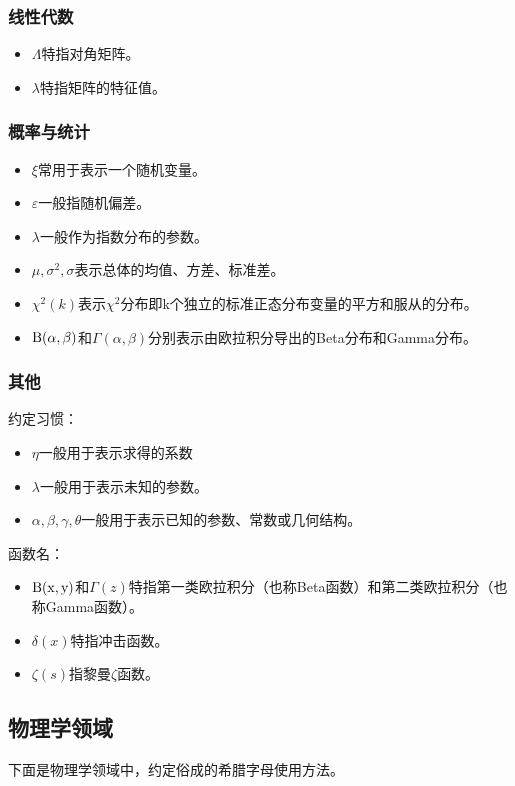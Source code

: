 \subsubsection{线性代数}

\begin{itemize}
\item $\Lambda$特指对角矩阵。
\item $\lambda$特指矩阵的特征值。
\end{itemize}

\subsubsection{概率与统计}

\begin{itemize}
\item $\xi$常用于表示一个随机变量。
\item $\varepsilon$一般指随机偏差。
\item $\lambda$一般作为指数分布的参数。
\item $\mu,\sigma^2,\sigma$表示总体的均值、方差、标准差。
\item $\chi^2(k)$表示$\chi^2$分布即k个独立的标准正态分布变量的平方和服从的分布。
\item ${\rm B(\alpha,\beta)}$和$\Gamma (\alpha,\beta)$分别表示由欧拉积分导出的Beta分布和Gamma分布。
\end{itemize}

\subsubsection{其他}

约定习惯：

\begin{itemize}
\item $\eta$一般用于表示求得的系数
\item $\lambda$一般用于表示未知的参数。
\item $\alpha,\beta,\gamma,\theta$一般用于表示已知的参数、常数或几何结构。
\end{itemize}

函数名：

\begin{itemize}
\item ${\rm B(x,y)}$和${\Gamma (z)}$特指第一类欧拉积分（也称Beta函数）和第二类欧拉积分（也称Gamma函数）。
\item $\delta(x)$特指冲击函数。
\item $\zeta(s)$指黎曼$\zeta$函数。
\end{itemize}

\subsection{物理学领域}

下面是物理学领域中，约定俗成的希腊字母使用方法。
